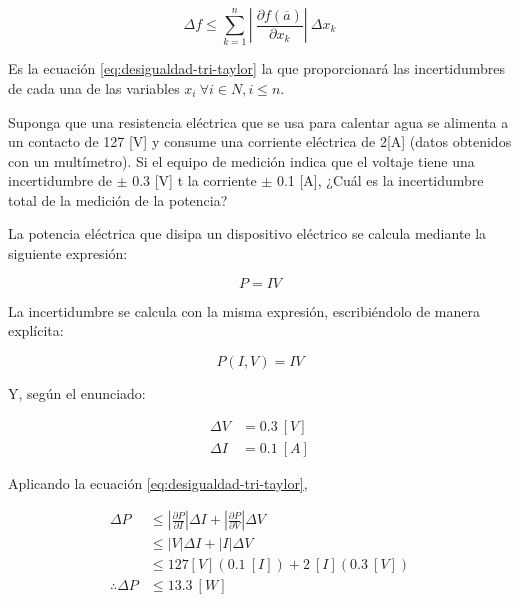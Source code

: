 \begin{equation} \label{eq:desigualdad-tri-taylor}
    \Delta f \leq \sum_{k=1}^{n} \left |\ 
    \frac{\partial f(\overline{a})}{\partial x_k} \right| \
    \Delta x_k
\end{equation}

Es la ecuación \ref{eq:desigualdad-tri-taylor} la que proporcionará las
incertidumbres de cada una de las variables $x_i\ \forall i \in N, i \leq n$.

\begin{ex}

    Suponga que una resistencia eléctrica que se usa para calentar agua se
    alimenta a un contacto de 127 [V] y consume una corriente eléctrica de
    2[A] (datos obtenidos con un multímetro). Si el equipo de medición
    indica que el voltaje tiene una incertidumbre de $\pm$ 0.3 [V] t la
    corriente $\pm$ 0.1 [A], ¿Cuál es la incertidumbre total de la medición de
    la potencia?

    \begin{solution}
        La potencia eléctrica que disipa un dispositivo eléctrico se
        calcula mediante la siguiente expresión:

        \begin{equation*}
            P = IV
        \end{equation*}

        La incertidumbre se calcula con la misma expresión,
        escribiéndolo de manera explícita:

        \begin{equation*}
            P(I, V) = IV
        \end{equation*}

        Y, según el enunciado:

        \begin{align*}
            \Delta V &= 0.3\ [\si{V}] \\
            \Delta I &= 0.1\ [\si{A}]
        \end{align*}


        Aplicando la ecuación \ref{eq:desigualdad-tri-taylor},

        \begin{align*}
            \Delta P &\leq
            \left| \frac{\partial P}{\partial I} \right| \Delta I +
            \left| \frac{\partial P}{\partial V} \right| \Delta V \\
                     &\leq \left| V \right| \Delta I + \left| I\right|
                     \Delta V \\
                     &\leq 127 [\si{V}](0.1\ [\si{I}]) + 2\ [\si{I}](0.3\ [\si{V}]) \\
            \therefore \Delta P &\leq 13.3\ [\si{W}]
        \end{align*}
    \end{solution}
\end{ex}



